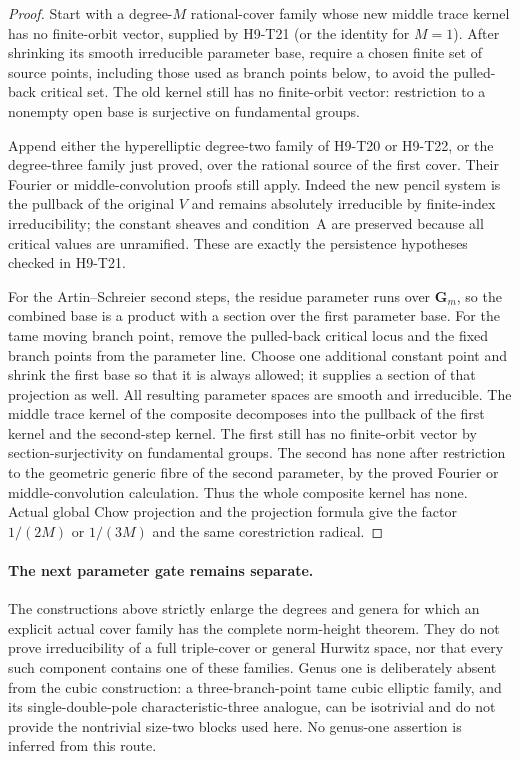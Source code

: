 \begin{proof}
Start with a degree-$M$ rational-cover
family whose new middle trace kernel has
no finite-orbit vector, supplied by H9-T21
(or the identity for $M=1$).
After shrinking its smooth irreducible
parameter base, require a chosen finite
set of source points, including those
used as branch points below, to avoid
the pulled-back critical set. The old
kernel still has no finite-orbit vector:
restriction to a nonempty open base is
surjective on fundamental groups.

Append either the hyperelliptic
degree-two family of H9-T20 or H9-T22,
or the degree-three family just proved,
over the rational source of the first
cover. Their Fourier or middle-convolution
proofs still apply. Indeed the new pencil
system is the pullback of the original
$V$ and remains absolutely irreducible
by finite-index irreducibility; the
constant sheaves and condition~A are
preserved because all critical values
are unramified. These are exactly the
persistence hypotheses checked in
H9-T21.

For the Artin--Schreier second steps,
the residue parameter runs over
$\mathbf G_m$, so the combined base is
a product with a section over the first
parameter base. For the tame moving
branch point, remove the pulled-back
critical locus and the fixed branch
points from the parameter line. Choose
one additional constant point and
shrink the first base so that it is
always allowed; it supplies a section
of that projection as well. All
resulting parameter spaces are smooth
and irreducible. The middle trace
kernel of the composite decomposes
into the pullback of the first kernel
and the second-step kernel. The first
still has no finite-orbit vector by
section-surjectivity on fundamental
groups. The second has none after
restriction to the geometric generic
fibre of the second parameter, by the
proved Fourier or middle-convolution
calculation. Thus the whole composite
kernel has none. Actual global Chow
projection and the projection formula
give the factor $1/(2M)$ or $1/(3M)$
and the same corestriction radical.
\end{proof}

\paragraph{The next parameter gate remains separate.}
The constructions above strictly enlarge
the degrees and genera for which an
explicit actual cover family has the
complete norm-height theorem. They do
not prove irreducibility of a full
triple-cover or general Hurwitz space,
nor that every such component contains
one of these families. Genus one is
deliberately absent from the cubic
construction: a three-branch-point
tame cubic elliptic family, and its
single-double-pole characteristic-three
analogue, can be isotrivial and do not
provide the nontrivial size-two blocks
used here. No genus-one assertion is
inferred from this route.
